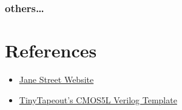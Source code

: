 \documentclass[a4paper]{report}
\begin{document}
			\subsection{others\ldots}

	\chapter{References}

		\begin{itemize}
			\item \href{https://blog.janestreet.com/protocol-emulator-asic-competition/}{Jane Street Website}
			\item \href{https://github.com/TinyTapeout/ttihp-verilog-template/tree/cmos5l}{TinyTapeout's CMOS5L Verilog Template}
		\end{itemize}
		
\end{document}
